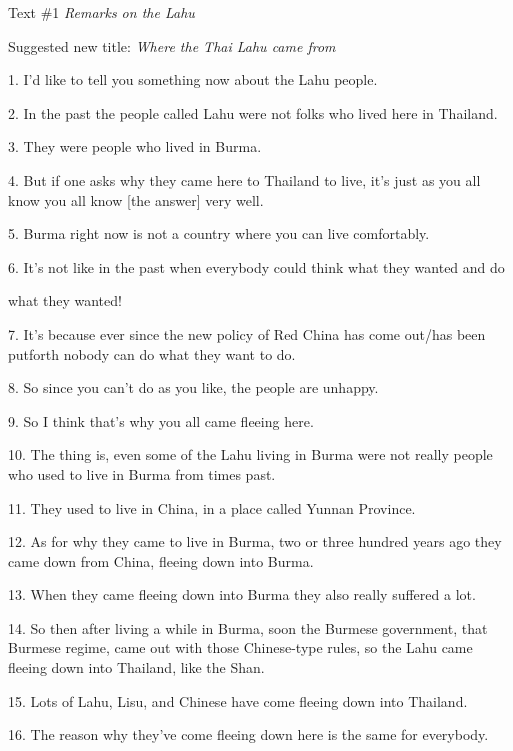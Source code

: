 
{\large{}Text \#1 }{\large{}\textit{Remarks on the Lahu}}

{\large{}Suggested new title:  }{\large{}\textit{Where the Thai Lahu came from}}

1. I'd like to tell you something now about the Lahu people.

2. In the past the people called Lahu were not folks who lived here in Thailand.

3. They were people who lived in Burma.

4. But if one asks why they came here to Thailand to live, it's just as you all
know you all know [the answer] very well.

5. Burma right now is not a country where you can live comfortably.

6. It's not like in the past when everybody could think what they wanted and do

what they wanted!

7. It's because ever since the new policy of Red China has come out/has been putforth
nobody can do what they want to do.

8. So since you can't do as you like, the people are unhappy.

9. So I think that's why you all came fleeing here.

10. The thing is, even some of the Lahu living in Burma were not really people who
used to live in Burma from times past.

11. They used to live in China, in a place called Yunnan Province.

12. As for why they came to live in Burma, two or three hundred years ago they
came down from China, fleeing down into Burma.

13. When they came fleeing down into Burma they also really suffered a lot.

14. So then after living a while in Burma, soon the Burmese government, that Burmese
regime, came out with those Chinese-type rules, so the Lahu came    fleeing down
into Thailand, like the Shan.

15. Lots of Lahu, Lisu, and Chinese have come fleeing down into Thailand.

16. The reason why they've come fleeing down here is the same for everybody.


